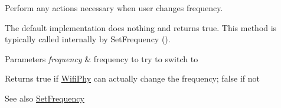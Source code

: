 Perform any actions necessary when user changes frequency. 

The default implementation does nothing and returns true. This method is typically called internally by Set\+Frequency ().


\begin{DoxyParams}{Parameters}
{\em frequency} & frequency to try to switch to \\
\hline
\end{DoxyParams}
\begin{DoxyReturn}{Returns}
true if \hyperlink{classns3_1_1WifiPhy}{Wifi\+Phy} can actually change the frequency; false if not 
\end{DoxyReturn}
\begin{DoxySeeAlso}{See also}
\hyperlink{classns3_1_1WifiPhy_afecd69b20631e112aa863dbed4c4bd22}{Set\+Frequency} 
\end{DoxySeeAlso}

